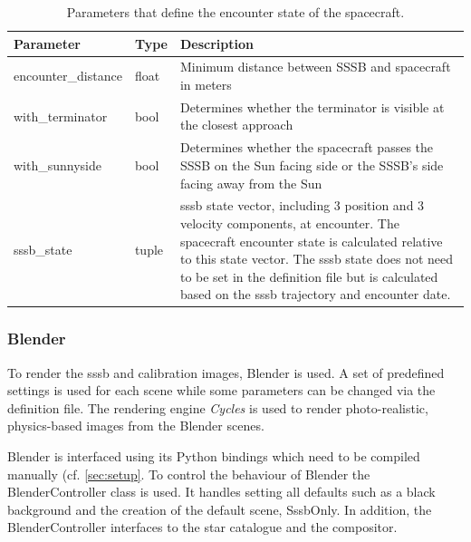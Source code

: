 \begin{table}[htb]
    \caption{Parameters that define the encounter state of the spacecraft.}
    \label{tab:sc_enc_paras}
    \begin{tabular}{p{}|p{}|p{}}
        Parameter           & Type  & Description                                                                                                                                                  \\ \hline
        encounter\_distance & float & Minimum distance between SSSB and spacecraft in meters                                                                                                       \\
        with\_terminator    & bool  & Determines whether the terminator is visible at the closest approach                                                                                         \\
        with\_sunnyside     & bool  & Determines whether the spacecraft passes the SSSB on the Sun facing side or the SSSB's side facing away from the Sun                                         \\
        sssb\_state         & tuple & \gls{sssb} state vector, including 3 position and 3 velocity components, at encounter. The spacecraft encounter state is calculated relative to this state vector. The \gls{sssb} state does not need to be set in the  definition file but is calculated based on the \gls{sssb} trajectory and encounter date.
    \end{tabular}
\end{table}

\subsubsection{Blender}
To render the \gls{sssb} and calibration images, Blender is used. A set of predefined settings is used for each scene while some parameters can be changed via the definition file. The rendering engine \textit{Cycles} is used to render photo-realistic, physics-based images from the Blender scenes.

Blender is interfaced using its Python bindings which need to be compiled manually (cf. \ref{sec:setup}. To control the behaviour of Blender the BlenderController class is used. It handles setting all defaults such as a black background and the creation of the default scene, SssbOnly. In addition, the BlenderController interfaces to the star catalogue and the compositor.

